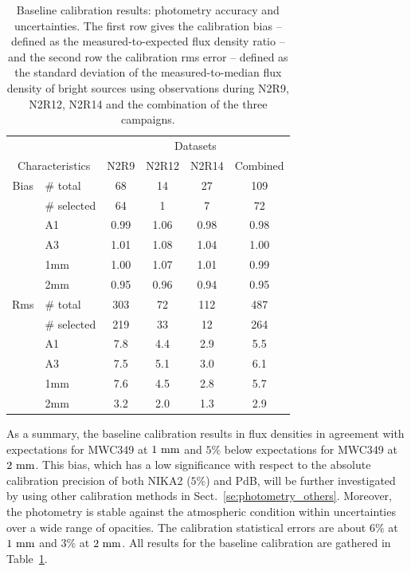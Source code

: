 \begin{table}[th]
\begin{center}
\begin{tabular}{|c|l|c|c|c|c|}
  \hline
  \multicolumn{2}{|c|}{}  &  \multicolumn{4}{|c|}{Datasets}  \\\cline{3-6}
  \multicolumn{2}{|c|}{Characteristics} &  N2R9  & N2R12   &  N2R14 &  Combined \\
  \hline\hline
  Bias &  $\#$ total    &  68    &  14     &   27     &    109    \\
       &  $\#$ selected &  64    &   1     &   7      &     72    \\
       &  A1            &  0.99  &  1.06   &   0.98   &   0.98    \\
       &  A3            &  1.01  &  1.08   &   1.04   &   1.00    \\
       &  1mm           &  1.00  &  1.07   &   1.01   &   0.99    \\
       &  2mm           &  0.95  &  0.96   &   0.94   &   0.95    \\
  \hline
  Rms  &  $\#$ total    &  303   &  72     &   112    &    487   \\
       &  $\#$ selected &  219   &  33     &    12    &    264   \\
       &  A1            &  7.8   &  4.4    &   2.9    &    5.5   \\
       &  A3            &  7.5   &  5.1    &   3.0    &    6.1   \\
       &  1mm           &  7.6   &  4.5    &   2.8    &    5.7   \\
       &  2mm           &  3.2   &  2.0    &   1.3    &    2.9   \\
\hline\hline
\end{tabular}
\caption[Baseline calibration results]{Baseline calibration results:
  photometry accuracy and uncertainties. The first row gives the calibration
  bias -- defined as the measured-to-expected flux density ratio --
  and the second row the calibration rms error -- defined as the
  standard deviation of the measured-to-median flux density of bright
  sources using observations during N2R9, N2R12, N2R14 and the
  combination of the three campaigns. }
\label{tab:baseline-photometry}
\end{center}
\end{table}


As a summary, the baseline calibration results in flux densities in
agreement with expectations for MWC349 at $1~\rm{mm}$ and $5\%$ below
expectations for MWC349 at $2~\rm{mm}$. This bias, which has a low
significance with respect to the absolute calibration precision of
both NIKA2 ($5\%$) and PdB, will be further investigated by using other
calibration methods in Sect.~\ref{se:photometry_others}. Moreover, the
photometry is stable against the atmospheric condition within
uncertainties over a wide range of opacities. The calibration
statistical errors are about $6\%$ at $1~\rm{mm}$ and $3\%$ at
$2~\rm{mm}$. All results for the baseline calibration are gathered in
Table~\ref{tab:baseline-photometry}.


